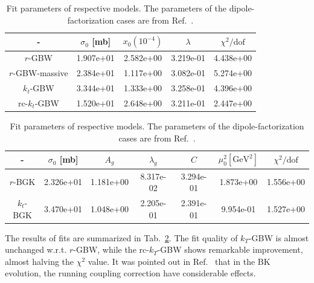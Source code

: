 \documentclass[11pt]{article}
\numberwithin{equation}{section}
\numberwithin{table}{section}
\numberwithin{figure}{section}
\begin{document}
\begin{table}[t]
\begin{subtable}{\textwidth}
\center\footnotesize
\begin{tabular}{|c|c|c|c|c|}
	\hline - & $\sigma_0 $ [mb] & $x_0 \left(10^{-4}\right)$ & $\lambda$ & $\chi^2/\mathrm{dof}$ \\\hline 
	{\footnotesize $r$-GBW} & 1.907e+01& 2.582e+00& 3.219e-01& 4.438e+00\\\hline 
	{\footnotesize $r$-GBW-massive} & 2.384e+01& 1.117e+00& 3.082e-01& 5.274e+00\\\hline 
	{\footnotesize $k_t$-GBW} & 3.344e+01& 1.333e+00& 3.258e-01& 4.396e+00\\\hline 
	{\footnotesize rc-$k_t$-GBW} & 1.520e+01& 2.648e+00& 3.211e-01& 2.447e+00\\\hline 
\end{tabular}
\vspace{2mm}
\end{subtable}
\begin{subtable}{\textwidth}
\center\footnotesize
\begin{tabular}{|c|c|c|c|c|c|c|}
	\hline - & $\sigma_0 $ [mb] & $A_g$ & $\lambda_g$ & $C$ & $\mu_0^2 \left[\mathrm{GeV^2}\right]$ & $\chi^2/\mathrm{dof}$ \\\hline 
	{\footnotesize $r$-BGK} & 2.326e+01& 1.181e+00& 8.317e-02& 3.294e-01& 1.873e+00& 1.556e+00\\\hline 
	{\footnotesize $k_t$-BGK} & 3.470e+01& 1.048e+00& 2.205e-01&2.391e-01& 9.954e-01&  1.527e+00\\\hline 
\end{tabular}
\vspace{2mm}
\end{subtable}
\caption{Fit parameters of respective models. The parameters of the
dipole-factorization cases are from Ref.~\cite{Goda:2022wsc}.}
\label{tab:table}
\end{table}


The results of fits are summarized in Tab.~\ref{tab:table}. 
The fit quality of $k_T$-GBW is almost unchanged w.r.t. $r$-GBW, while the rc-$k_T$-GBW shows remarkable improvement, almost halving the $\chi^2$ value.
It was pointed out in Ref.~\cite{Albacete:2004gw,Albacete:2007yr,Albacete:2010sy} that in the BK evolution, the running coupling correction have considerable effects.
\end{document}

